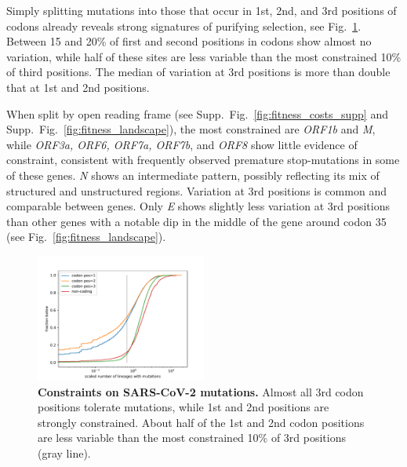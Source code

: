 \documentclass[aps,rmp, twocolumn]{revtex4}
\begin{document}
Simply splitting mutations into those that occur in 1st, 2nd, and 3rd positions of codons already reveals strong signatures of purifying selection, see Fig.~\ref{fig:fitness_costs}.
Between 15 and 20\% of first and second positions in codons show almost no variation, while half of these sites are less variable than the most constrained 10\% of third positions.
The median of variation at 3rd positions is more than double that at 1st and 2nd positions.

When split by open reading frame (see Supp.~Fig.~\ref{fig:fitness_costs_supp} and Supp.~Fig.~\ref{fig:fitness_landscape}), the most constrained are \emph{ORF1b} and \emph{M}, while \emph{ORF3a, ORF6, ORF7a, ORF7b}, and \emph{ORF8} show little evidence of constraint, consistent with frequently observed premature stop-mutations in some of these genes.
\emph{N} shows an intermediate pattern, possibly reflecting its mix of structured and unstructured regions.
Variation at 3rd positions is common and comparable between genes.
Only \emph{E} shows slightly less variation at 3rd positions than other genes with a notable dip in the middle of the gene around codon 35 (see Fig.~\ref{fig:fitness_landscape}).



\begin{figure}
    \includegraphics[width=0.5\textwidth]{figures/fitness_cost.pdf}
    \caption{{\bf Constraints on SARS-CoV-2 mutations.}
    Almost all 3rd codon positions tolerate mutations, while 1st and 2nd positions are strongly constrained.
    About half of the 1st and 2nd codon positions are less variable than the most constrained 10\% of 3rd positions (gray line).
    \label{fig:fitness_costs}}
 \end{figure}
\end{document}
